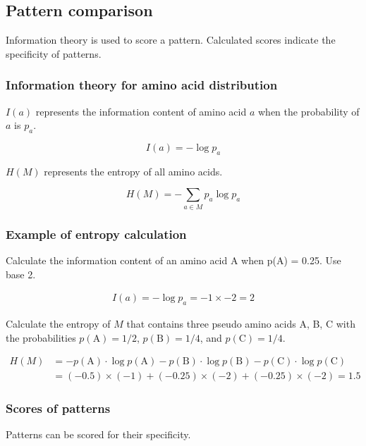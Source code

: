 %
%

%
%
\subsection{Pattern comparison}
Information theory is used to score a pattern. Calculated scores indicate the specificity of patterns.

%
%
\subsubsection*{Information theory for amino acid distribution}
$I(a)$ represents the information content of amino acid $a$ when the probability of $a$ is $p_a$. 

\[
I(a) = -\log⁡ p_a
\]

\noindent
$H(M)$ represents the entropy of all amino acids.

\[
H(M) = -\sum_{a \in M}p_a \log⁡ p_a
\]

%
%
\subsubsection*{Example of entropy calculation }
Calculate the information content of an amino acid A when p(A) = 0.25. Use base 2.

\begin{align*}
I(a) = -\log⁡ p_a = -1 × -2 = 2
\end{align*}

\noindent
Calculate the entropy of $M$ that contains three pseudo amino acids A, B, C with the probabilities $p(\mathrm{A})=1/2$, $p(\mathrm{B})=1/4$, and $p(\mathrm{C})=1/4$. 

\begin{align*}
H(M) &= -p(\mathrm{A}) \cdot \log⁡ p(\mathrm{A}) - p(\mathrm{B})  \cdot  \log ⁡p(\mathrm{B} ) - p(\mathrm{C})  \cdot  \log⁡ p(\mathrm{C}) \\
 & = (-0.5) \times (-1) + (-0.25) \times (-2) + (-0.25) \times (-2) = 1.5
\end{align*}

%
%
\subsubsection*{Scores of patterns}
Patterns can be scored for their specificity. 

